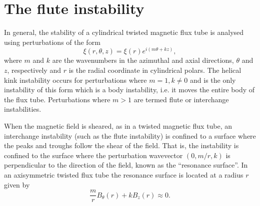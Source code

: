 \documentclass[fleqn,usenatbib]{mnras}
\begin{document}
\section{The flute instability}
\label{sec-flute-intro}

In general, the stability of a cylindrical twisted magnetic flux tube is analysed using perturbations of the form
\begin{equation}
  \label{eq:kink_perturbation}
\xi(r, \theta, z) = \xi(r) e^{i(m\theta + kz)},
\end{equation}
where $m$ and $k$ are the wavenumbers in the azimuthal and axial directions,
$\theta$ and $z$, respectively and $r$ is the radial coordinate in cylindrical
polars. The helical kink instability occurs for perturbations where $m=1,
k\ne0$ and is the only instability of this form which is a body instability,
i.e.{} it moves the entire body of the flux tube. Perturbations where $m>1$
are termed flute or interchange instabilities.

When the magnetic field is sheared, as in a twisted magnetic flux tube, an
interchange instability (such as the flute instability) is confined to
a surface where the peaks and troughs follow the shear of the field. That is,
the instability is confined to the surface where the perturbation wavevector
$(0, m/r, k)$ is perpendicular to the direction of the field, known as the
``resonance surface''. In an axisymmetric twisted flux tube the resonance
surface is located at a radius $r$ given by
\begin{equation}
  \label{eq:resonant_surface}
\frac{m}{r} B_{\theta}(r) + kB_z(r) \approx 0.
\end{equation}
\end{document}
